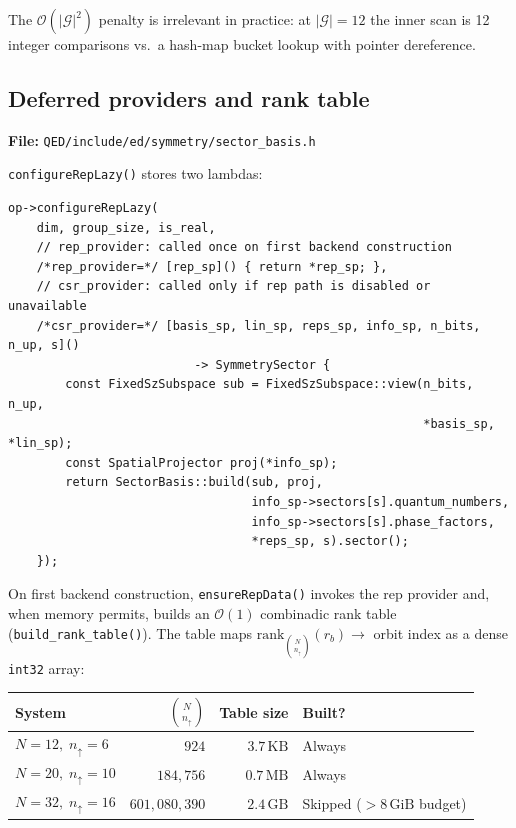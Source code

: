 \documentclass[11pt,a4paper]{article}
\begin{document}
The $\mathcal{O}(|\mathcal{G}|^2)$ penalty is irrelevant in practice: at
$|\mathcal{G}| = 12$ the inner scan is 12 integer comparisons vs.\ a
hash-map bucket lookup with pointer dereference.

\subsection{Deferred providers and rank table}

\textbf{File:} \texttt{QED/include/ed/symmetry/sector\_basis.h}

\texttt{configureRepLazy()} stores two lambdas:

\begin{lstlisting}[caption={Deferred provider registration (sector\_basis.h)}]
op->configureRepLazy(
    dim, group_size, is_real,
    // rep_provider: called once on first backend construction
    /*rep_provider=*/ [rep_sp]() { return *rep_sp; },
    // csr_provider: called only if rep path is disabled or unavailable
    /*csr_provider=*/ [basis_sp, lin_sp, reps_sp, info_sp, n_bits, n_up, s]()
                          -> SymmetrySector {
        const FixedSzSubspace sub = FixedSzSubspace::view(n_bits, n_up,
                                                          *basis_sp, *lin_sp);
        const SpatialProjector proj(*info_sp);
        return SectorBasis::build(sub, proj,
                                  info_sp->sectors[s].quantum_numbers,
                                  info_sp->sectors[s].phase_factors,
                                  *reps_sp, s).sector();
    });
\end{lstlisting}

On first backend construction, \texttt{ensureRepData()} invokes the rep
provider and, when memory permits, builds an $\mathcal{O}(1)$ combinadic rank
table (\texttt{build\_rank\_table()}).  The table maps
$\mathrm{rank}_{\binom{N}{n_\uparrow}}(r_b) \to$ orbit index as a dense
\texttt{int32} array:

\begin{center}
\begin{tabular}{@{}lrrl@{}}
\toprule
System & $\binom{N}{n_\uparrow}$ & Table size & Built? \\
\midrule
$N=12,\;n_\uparrow=6$ & $924$ & $3.7\,\mathrm{KB}$ & Always \\
$N=20,\;n_\uparrow=10$ & $184{,}756$ & $0.7\,\mathrm{MB}$ & Always \\
$N=32,\;n_\uparrow=16$ & $601{,}080{,}390$ & $2.4\,\mathrm{GB}$ & Skipped ($>8\,\mathrm{GiB}$ budget) \\
\bottomrule
\end{tabular}
\end{center}
\end{document}
